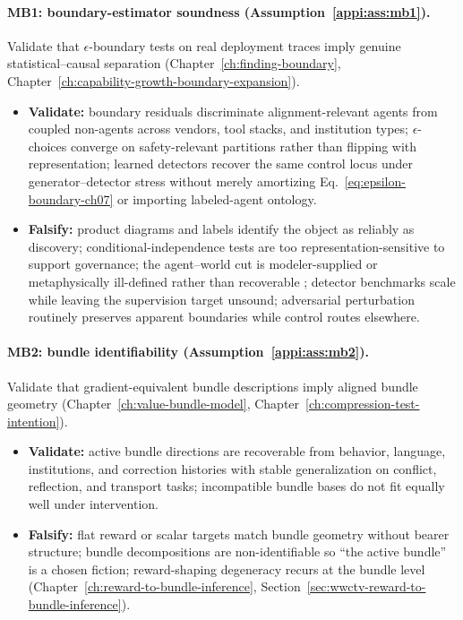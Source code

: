 \paragraph{MB1: boundary-estimator soundness (Assumption~\ref{appi:ass:mb1}).}
Validate that \(\epsilon\)-boundary tests on real deployment traces imply genuine statistical--causal separation (Chapter~\ref{ch:finding-boundary}, Chapter~\ref{ch:capability-growth-boundary-expansion}).
\begin{itemize}[nosep]
  \item \textbf{Validate:} boundary residuals discriminate alignment-relevant agents from coupled non-agents across vendors, tool stacks, and institution types; \(\epsilon\)-choices converge on safety-relevant partitions rather than flipping with representation; learned detectors recover the same control locus under generator--detector stress without merely amortizing Eq.~\eqref{eq:epsilon-boundary-ch07} or importing labeled-agent ontology.
  \item \textbf{Falsify:} product diagrams and labels identify the object as reliably as discovery; conditional-independence tests are too representation-sensitive to support governance; the agent--world cut is modeler-supplied or metaphysically ill-defined rather than recoverable \autocite{bruineberg2021emperor,btesh2022redressing}; detector benchmarks scale while leaving the supervision target unsound; adversarial perturbation routinely preserves apparent boundaries while control routes elsewhere.
\end{itemize}

\paragraph{MB2: bundle identifiability (Assumption~\ref{appi:ass:mb2}).}
Validate that gradient-equivalent bundle descriptions imply aligned bundle geometry (Chapter~\ref{ch:value-bundle-model}, Chapter~\ref{ch:compression-test-intention}).
\begin{itemize}[nosep]
  \item \textbf{Validate:} active bundle directions are recoverable from behavior, language, institutions, and correction histories with stable generalization on conflict, reflection, and transport tasks; incompatible bundle bases do not fit equally well under intervention.
  \item \textbf{Falsify:} flat reward or scalar targets match bundle geometry without bearer structure; bundle decompositions are non-identifiable so ``the active bundle'' is a chosen fiction; reward-shaping degeneracy recurs at the bundle level (Chapter~\ref{ch:reward-to-bundle-inference}, Section~\ref{sec:wwctv-reward-to-bundle-inference}).
\end{itemize}

